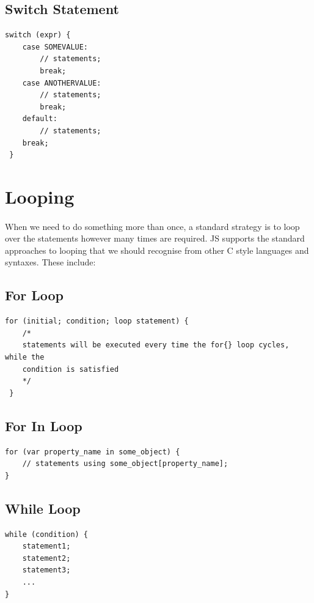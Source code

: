 \subsection{Switch Statement}
\begin{lstlisting}
switch (expr) {
  	case SOMEVALUE:
   		// statements;
		break;
  	case ANOTHERVALUE:
   		// statements;
   		break;
  	default:
   		// statements;
   	break;
 }
\end{lstlisting}



\section{Looping}
\paragraph{} When we need to do something more than once, a standard strategy is to loop over the statements however many times are required. JS supports the standard approaches to looping that we should recognise from other C style languages and syntaxes. These include:

\subsection{For Loop}

\begin{lstlisting}
for (initial; condition; loop statement) {
  	/*
   	statements will be executed every time the for{} loop cycles, while the
   	condition is satisfied
  	*/
 }
\end{lstlisting}

\subsection{For In Loop}

\begin{lstlisting}
for (var property_name in some_object) {
  	// statements using some_object[property_name];
}
\end{lstlisting}

\subsection{While Loop}

\begin{lstlisting}
while (condition) {
  	statement1;
  	statement2;
  	statement3;
  	...
}
\end{lstlisting}

